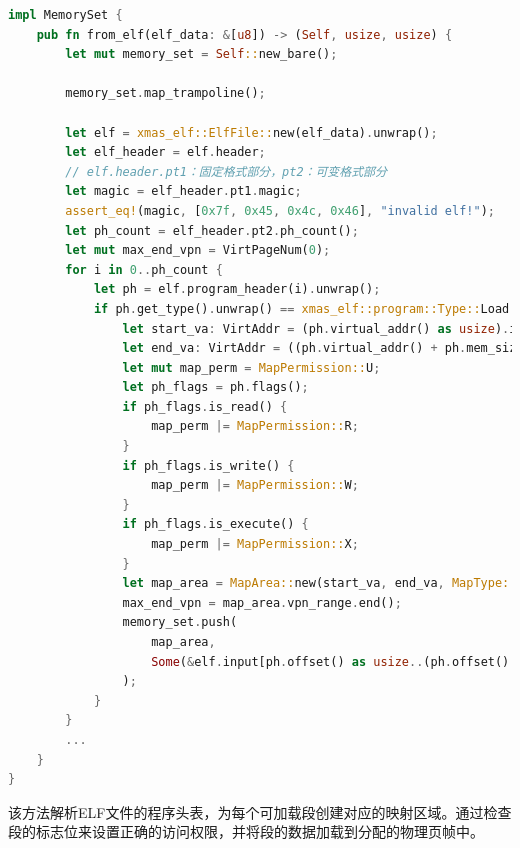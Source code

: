 \begin{lstlisting}[language=Rust,caption={用户地址空间创建}, label={lst:user-memory-set}]
impl MemorySet {
    pub fn from_elf(elf_data: &[u8]) -> (Self, usize, usize) {
        let mut memory_set = Self::new_bare();

        memory_set.map_trampoline();

        let elf = xmas_elf::ElfFile::new(elf_data).unwrap();
        let elf_header = elf.header;
        // elf.header.pt1：固定格式部分，pt2：可变格式部分
        let magic = elf_header.pt1.magic;
        assert_eq!(magic, [0x7f, 0x45, 0x4c, 0x46], "invalid elf!");
        let ph_count = elf_header.pt2.ph_count();
        let mut max_end_vpn = VirtPageNum(0);
        for i in 0..ph_count {
            let ph = elf.program_header(i).unwrap();
            if ph.get_type().unwrap() == xmas_elf::program::Type::Load {
                let start_va: VirtAddr = (ph.virtual_addr() as usize).into();
                let end_va: VirtAddr = ((ph.virtual_addr() + ph.mem_size()) as usize).into();
                let mut map_perm = MapPermission::U;
                let ph_flags = ph.flags();
                if ph_flags.is_read() {
                    map_perm |= MapPermission::R;
                }
                if ph_flags.is_write() {
                    map_perm |= MapPermission::W;
                }
                if ph_flags.is_execute() {
                    map_perm |= MapPermission::X;
                }
                let map_area = MapArea::new(start_va, end_va, MapType::Framed, map_perm);
                max_end_vpn = map_area.vpn_range.end();
                memory_set.push(
                    map_area,
                    Some(&elf.input[ph.offset() as usize..(ph.offset() + ph.file_size()) as usize]),
                );
            }
        }
        ...
    }
}
\end{lstlisting}

该方法解析ELF文件的程序头表，为每个可加载段创建对应的映射区域。通过检查段的标志位来设置正确的访问权限，并将段的数据加载到分配的物理页帧中。

